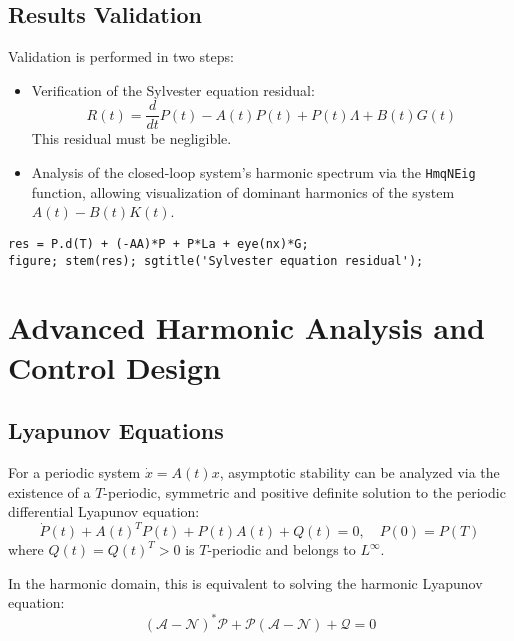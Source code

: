 \documentclass[11pt,a4paper]{article}
\begin{document}
\subsection{Results Validation}

Validation is performed in two steps:
\begin{itemize}
    \item Verification of the Sylvester equation residual: 
    \begin{equation}
    R(t) = \frac{d}{dt}P(t) - A(t)P(t) + P(t)\Lambda + B(t)G(t)
    \end{equation}
    This residual must be negligible.

    \item Analysis of the closed-loop system's harmonic spectrum via the \texttt{HmqNEig} function, allowing visualization of dominant harmonics of the system $A(t) - B(t)K(t)$.
\end{itemize}

\begin{lstlisting}[style=matlabstyle]
% Residual
res = P.d(T) + (-AA)*P + P*La + eye(nx)*G;
figure; stem(res); sgtitle('Sylvester equation residual');
\end{lstlisting}

\section{Advanced Harmonic Analysis and Control Design}

\subsection{Lyapunov Equations}

For a periodic system $\dot{x} = A(t)x$, asymptotic stability can be analyzed via the existence of a $T$-periodic, symmetric and positive definite solution to the periodic differential Lyapunov equation:
\begin{equation}
\dot{P}(t) + A(t)^T P(t) + P(t) A(t) + Q(t) = 0, \quad P(0) = P(T)
\end{equation}
where $Q(t) = Q(t)^T > 0$ is $T$-periodic and belongs to $L^\infty$.

In the harmonic domain, this is equivalent to solving the harmonic Lyapunov equation:
\begin{equation}
(\mathcal{A} - \mathcal{N})^* \mathcal{P} + \mathcal{P}(\mathcal{A} - \mathcal{N}) + \mathcal{Q} = 0
\end{equation}
\end{document}
